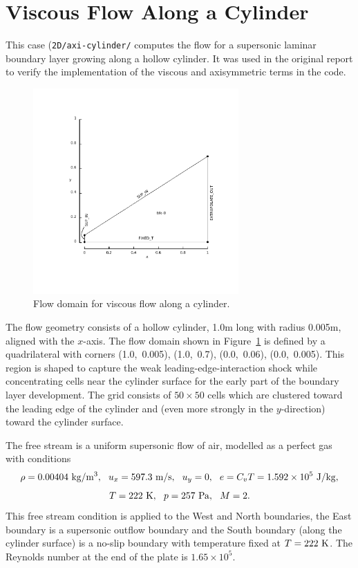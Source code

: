 
\newpage
\section{Viscous Flow Along a Cylinder}
\label{axi-cylinder-sec}
%
This case (\texttt{2D/axi-cylinder/} computes the flow for
a supersonic laminar boundary layer growing along a hollow cylinder.
It was used in the original report\cite{jacobs_91d} to verify the implementation of
the viscous and axisymmetric terms in the code.

\begin{figure}[htbp]
\begin{center}
\includegraphics[width=0.7\textwidth,viewport=79 77 400 392,clip=true]{../2D/axi-cylinder/cyl50.pdf}
\end{center}
\caption{Flow domain for viscous flow along a cylinder.}
   \label{cyl50-layout-fig}
\end{figure}

\medskip
The flow geometry consists of a hollow cylinder, 1.0m long with
radius 0.005m, aligned with the $x$-axis.
The flow domain shown in Figure~\ref{cyl50-layout-fig} is defined
by a quadrilateral with corners (1.0,~0.005), (1.0,~0.7),
(0.0,~0.06), (0.0,~0.005).
This region is shaped to capture the weak leading-edge-interaction shock 
while concentrating cells near the cylinder surface for the early part of the boundary layer development.
The grid consists of $50 \times 50$ cells which are clustered toward
the leading edge of the cylinder and 
(even more strongly in the $y$-direction) toward the cylinder surface.

\medskip
The free stream is a uniform supersonic flow of air, modelled
as a perfect gas with conditions
$$
   \rho = 0.00404~ {\rm kg/m^3},~~
   u_x = 597.3~ {\rm m/s}, ~~
   u_y = 0, ~~
   e = C_v T = 1.592 \times 10^5 ~ {\rm J/kg},
$$
%
$$
   T = 222~ {\rm K}, ~~
   p = 257~ {\rm Pa}, ~~
   M = 2.
$$
This free stream condition is applied to the West and North
boundaries, the East boundary is a supersonic outflow boundary and
the South boundary (along the cylinder surface) is a no-slip
boundary with temperature fixed at $T = 222~\rm K$.
The Reynolds number at the end of the plate is $1.65 \times 10^5$.

